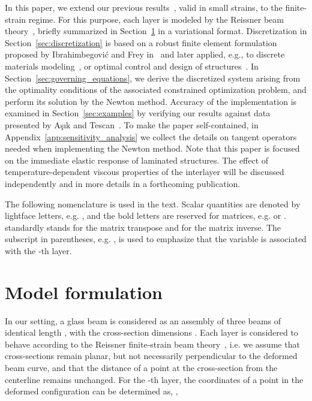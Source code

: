 \documentclass[11pt]{article}
\newcommand{\rev}[1]{#1}
\newcommand{\Aref}[1]{Appendix~\ref{#1}}
\newcommand{\Sref}[1]{Section~\ref{#1}}
\begin{document}
In this paper, we extend our previous
results~\cite{Zemanova:2008:SNM}, valid in small strains, to the finite-strain
regime. For this purpose, each layer is modeled by the Reissner beam
theory~\cite{Reissner:1972:ODFSBT}, briefly summarized in \Sref{sec:formulation}
in a variational format. Discretization in \Sref{sec:discretization} is
based on a robust finite element formulation proposed by Ibrahimbegovi\'{c} and
Frey in~\cite{Ibrahimbegovic:1993:FEA} and later applied, e.g., to discrete
materials modeling~\cite{Ibrahimbegovic:2003:MMD}, or optimal control and design
of structures~\cite{Ibrahimbegovic:2004}. In \Sref{sec:governing_equations}, we
derive the discretized system arising from the optimality conditions of the
associated constrained optimization problem, and perform its solution by the
Newton method. Accuracy of the implementation is examined in \Sref{sec:examples}
by verifying our results against data presented by A\c{s}\i{}k and
Tescan~\cite{Asik:2005:MMB}. To make the paper self-contained, in
\Aref{app:sensitivity_analysis} we collect the details on tangent operators
needed when implementing the Newton method. Note that this paper is focused on
the immediate elastic response of laminated structures. The effect of
\rev{temperature}-dependent viscous properties of the interlayer will be
discussed independently and in more details in a forthcoming publication.

The following nomenclature is used in the text. Scalar quantities are denoted by
lightface letters, e.g. , and the bold letters are reserved for matrices,
e.g.  or .  standardly stands for the matrix transpose
and  for the matrix inverse. The subscript in parentheses, e.g.
, is used to emphasize that the variable  is associated with the
-th layer.

\section{Model formulation}\label{sec:formulation}

In our setting, a glass beam is considered as an assembly of
three beams of identical length , with the cross-section dimensions .
Each layer is considered to behave according to the Reissner finite-strain beam
theory~\cite{Reissner:1972:ODFSBT}, i.e. we assume that cross-sections remain
planar, but not necessarily perpendicular to the deformed beam curve, and that
the distance of a point at the cross-section from the centerline remains
unchanged. For the -th layer, the coordinates of a point in the deformed
configuration can be determined as, ,
\end{document}

